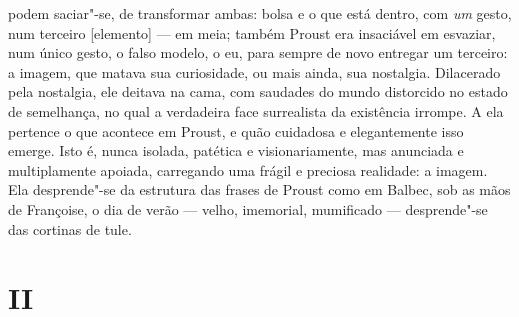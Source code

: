 podem saciar"-se, de transformar ambas: bolsa e o que está dentro, com
\emph{um} gesto, num terceiro {[}elemento{]} --- em meia; também Proust
era insaciável em esvaziar, num único gesto, o falso modelo, o eu, para
sempre de novo entregar um terceiro: a imagem, que matava sua
curiosidade, ou mais ainda, sua nostalgia. Dilacerado pela nostalgia,
ele deitava na cama, com saudades do mundo distorcido no estado de
semelhança, no qual a verdadeira face surrealista da existência irrompe.
A ela pertence o que acontece em Proust, e quão cuidadosa e
elegantemente isso emerge. Isto é, nunca isolada, patética e
visionariamente, mas anunciada e multiplamente apoiada, carregando uma
frágil e preciosa realidade: a imagem. Ela desprende"-se da estrutura das
frases de Proust como em Balbec, sob as mãos de Françoise, o dia de
verão --- velho, imemorial, mumificado --- desprende"-se das cortinas de tule.

\section{II}

